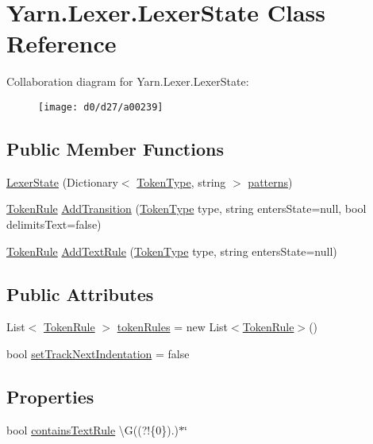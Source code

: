 \hypertarget{a00048}{\section{Yarn.\-Lexer.\-Lexer\-State Class Reference}
\label{a00048}
}


Collaboration diagram for Yarn.\-Lexer.\-Lexer\-State\-:
\nopagebreak
\begin{figure}[H]
\begin{center}
\leavevmode
\texttt{[image: d0/d27/a00239]}
\end{center}
\end{figure}
\subsection*{Public Member Functions}
\begin{DoxyCompactItemize}
\item 
\hyperlink{a00048_ac67a7c0e09d7b4350f75b105723a4f6c}{Lexer\-State} (Dictionary$<$ \hyperlink{a00026_a301aa7c866593a5b625a8fc158bbeace}{Token\-Type}, string $>$ \hyperlink{a00048_a951f91e9522ffe84851f2e25e9445106}{patterns})
\item 
\hyperlink{a00082}{Token\-Rule} \hyperlink{a00048_a71ba52744e853ff142de19e97cf5daed}{Add\-Transition} (\hyperlink{a00026_a301aa7c866593a5b625a8fc158bbeace}{Token\-Type} type, string enters\-State=null, bool delimits\-Text=false)
\item 
\hyperlink{a00082}{Token\-Rule} \hyperlink{a00048_af183111863c651ae5681665a2c379830}{Add\-Text\-Rule} (\hyperlink{a00026_a301aa7c866593a5b625a8fc158bbeace}{Token\-Type} type, string enters\-State=null)
\end{DoxyCompactItemize}
\subsection*{Public Attributes}
\begin{DoxyCompactItemize}
\item 
List$<$ \hyperlink{a00082}{Token\-Rule} $>$ \hyperlink{a00048_adf6563b1dc6f3ef80ed13c2b15b7be03}{token\-Rules} = new List$<$\hyperlink{a00082}{Token\-Rule}$>$()
\item 
bool \hyperlink{a00048_ad8b6ccac53bedd9dc202ffe6ac5698b2}{set\-Track\-Next\-Indentation} = false
\end{DoxyCompactItemize}
\subsection*{Properties}
\begin{DoxyCompactItemize}
\item 
bool \hyperlink{a00048_a69948f05c35eeae9cb8448c849a053e6}{contains\-Text\-Rule} \textbackslash{}G((?!\{0\}).)$\ast$\char`\"{}
\end{DoxyCompactItemize}
